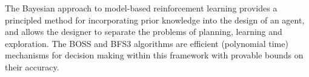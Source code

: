 The Bayesian approach to model-based reinforcement learning provides a principled method for incorporating prior knowledge into the design of an agent, and allows the designer to separate the problems of planning, learning and exploration.  The BOSS and BFS3 algorithms are efficient (polynomial time) mechanisms for decision making within this framework with provable bounds on their accuracy. 


